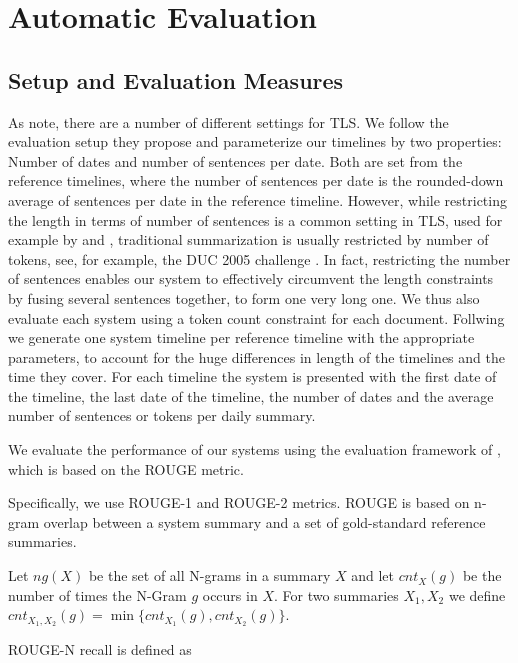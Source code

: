 \documentclass[a4paper,BCOR=10mm]{report}
\numberwithin{lemma}{chapter}
\numberwithin{definition}{chapter}
\begin{document}
\chapter{Automatic Evaluation}

\section{Setup and Evaluation Measures}

As \citet{markert} note, there are a number of different settings for TLS.
We follow the evaluation setup they propose and parameterize our timelines by two properties: Number of dates and number of sentences per date. Both are set from the reference timelines, where the number of sentences per date is the rounded-down average of sentences per date in the reference timeline.
However, while restricting the length in terms of number of sentences is a common setting in TLS, used for example by \citet{chieu} and \citet{yan-trans}, traditional summarization is usually restricted by number of tokens, see, for example, the DUC 2005 challenge \citep{duc2005}. In fact, restricting the number of sentences enables our system to effectively circumvent the length constraints by fusing several sentences together, to form one very long one.
We thus also evaluate each system using a token count constraint for each document.
Follwing \citeauthor{markert} we generate one system timeline per reference timeline with the appropriate parameters, to account for the huge differences in length of the timelines and the time they cover. For each timeline the system is presented with the first date of the timeline, the last date of the timeline, the number of dates and the average number of sentences or tokens per daily summary.

We evaluate the performance of our systems using the evaluation framework of \citet{tilse}, which is based on the ROUGE \citep{rouge} metric.

Specifically, we use ROUGE-1 and ROUGE-2 metrics.
ROUGE is based on n-gram overlap between a system summary and a set of gold-standard reference summaries.

Let $\mathit{ng}(X)$ be the set of all N-grams in a summary $X$ and let $\mathit{cnt}_{X}(g)$ be the number of times the N-Gram $g$ occurs in $X$.
For two summaries $X_1, X_2$ we define $\mathit{cnt}_{X_1, X_2}(g) = \min\{  \mathit{cnt}_{X_1}(g),  \mathit{cnt}_{X_2}(g) \}$.

ROUGE-N recall is defined as
\end{document}
